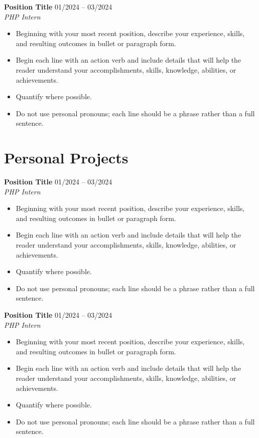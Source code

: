 \documentclass[10pt,a4paper]{article}
\begin{document}
\vspace{6pt}

\noindent \textbf{Position Title} \hfill 01/2024 -- 03/2024 \\
\textit{PHP Intern} \hfill %

\begin{itemize}[noitemsep, topsep=0pt, partopsep=0pt, parsep=0pt]
    \item Beginning with your most recent position, describe your experience, skills, and resulting outcomes in bullet or paragraph form.
    \item Begin each line with an action verb and include details that will help the reader understand your accomplishments, skills, knowledge, abilities, or achievements.
    \item Quantify where possible.
    \item Do not use personal pronouns; each line should be a phrase rather than a full sentence.
\end{itemize}

\section*{Personal Projects}

\noindent \textbf{Position Title} \hfill 01/2024 -- 03/2024 \\
\textit{PHP Intern} \hfill %

\begin{itemize}[noitemsep, topsep=0pt, partopsep=0pt, parsep=0pt]
    \item Beginning with your most recent position, describe your experience, skills, and resulting outcomes in bullet or paragraph form.
    \item Begin each line with an action verb and include details that will help the reader understand your accomplishments, skills, knowledge, abilities, or achievements.
    \item Quantify where possible.
    \item Do not use personal pronouns; each line should be a phrase rather than a full sentence.
\end{itemize}

\vspace{6pt}

\noindent \textbf{Position Title} \hfill 01/2024 -- 03/2024 \\
\textit{PHP Intern} \hfill %

\begin{itemize}[noitemsep, topsep=0pt, partopsep=0pt, parsep=0pt]
    \item Beginning with your most recent position, describe your experience, skills, and resulting outcomes in bullet or paragraph form.
    \item Begin each line with an action verb and include details that will help the reader understand your accomplishments, skills, knowledge, abilities, or achievements.
    \item Quantify where possible.
    \item Do not use personal pronouns; each line should be a phrase rather than a full sentence.
\end{itemize}
\end{document}
